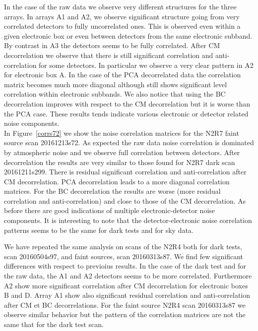 In the case of the raw data we observe very different structures for the three arrays. In arrays A1 and A2, we observe significant structure going from very correlated detectors to fully uncorrelated ones. This is observed even within a given electronic box or even between detectors from the same electronic subband. By contrast in A3 the detectors seems to be fully correlated. After CM decorrelation we observe that there is still significant correlation and anti-correlation for some detectors. In particular we observe a very clear pattern in A2 for electronic box A. In the case of the PCA decorrelated data the correlation matrix becomes much more diagonal although still shows significant level correlation within electronic subbands. We also notice that using the BC decorrelation improves with respect to the CM decorrelation but it is worse than the PCA case. These results tends indicate various electronic or detector related noise components. \\

In Figure~\ref{corrs72} we show the noise correlation matrices for the N2R7 faint source scan 20161213s72. As expected the raw data noise correlation is dominated by atmospheric noise and we observe full correlation between detectors. After decorrelation the results are very similar to those found for N2R7 dark scan 20161211s299. There is residual significant correlation and anti-correlation after CM decorrelation. PCA decorrelation leads to a more diagonal correlation matrices. For the BC decorrelation the results are worse (more residual correlation and anti-correlation) and close to those of the CM decorrelation. As before there are good indications of multiple electronic-detector noise components. It is interesting to note that the detector-electronic noise correlation patterns seems to be the same for dark tests and for sky data. 

We have repeated the same analysis on scans of the N2R4 both for dark tests, scan 20160504s97, and faint sources, scan 20160313s87. We find few significant differences with respect to previoius results. In the case of the dark test and for the raw data, the A1 and A2 detectors seems to be more correlated. Furthermore A2 show more significant correlation after CM decorrelation for electronic boxes B and D. Array A1 show also significant residual correlation and anti-correlation after CM et BC decorrelations. For the faint source N2R4 scan 
20160313s87 we observe similar behavior but the pattern of the correlation matrices are not the same that for the dark test scan.


